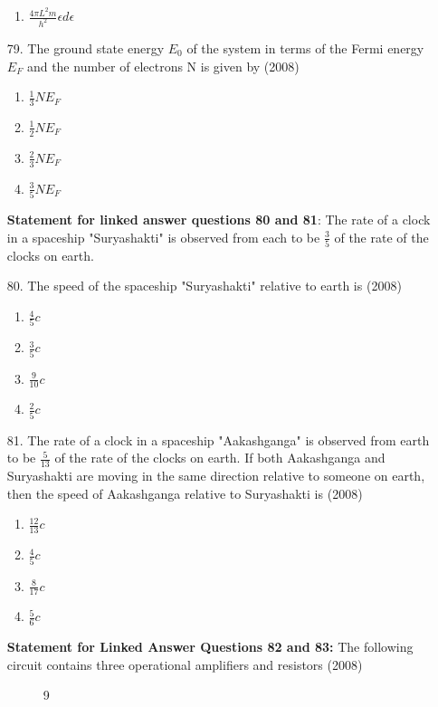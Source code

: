 \documentclass[journal]{IEEEtran}
\begin{document}
\begin{enumerate}
\begin{enumerate}[label=(\Alph*)]
        \item  $\frac{4\pi L^2 m}{h^2}\epsilon d\epsilon$
    \end{enumerate}
    \item[79.]  The ground state energy $E_0$ of the system in terms of the Fermi energy $E_F$ and the number of electrons N is given by \hfill (2008)
    \begin{enumerate}[label=(\Alph*)]
        \item $\frac{1}{3}NE_F$
        \item $\frac{1}{2}NE_F$
        \item $\frac{2}{3}NE_F$
        \item $\frac{3}{5}NE_F$
    \end{enumerate}
    \textbf{Statement for linked answer questions 80 and 81}:
    The rate of a clock in a spaceship "Suryashakti" is observed from each to be $\frac{3}{5}$ of the rate of the clocks on earth.
    \item[80.]  The speed of the spaceship "Suryashakti" relative to earth is \hfill (2008)
    \begin{enumerate}[label=(\Alph*)]
        \item $\frac{4}{5}c$
        \item $\frac{3}{5}c$
        \item $\frac{9}{10}c$
        \item $\frac{2}{5}c$
    \end{enumerate}
    \item[81.] The rate of a clock in a spaceship "Aakashganga" is observed from earth to be $\frac{5}{13}$ of the rate of the clocks on earth. If both Aakashganga and Suryashakti are moving in the same direction relative to someone on earth, then the speed of Aakashganga relative to Suryashakti is \hfill (2008)
    \begin{enumerate}[label=(\Alph*)]
        \item $\frac{12}{13}c$
        \item $\frac{4}{5}c$
        \item $\frac{8}{17}c$
        \item $\frac{5}{6}c$
    \end{enumerate}
    \textbf{Statement for Linked Answer Questions 82 and 83:}
    The following circuit contains three operational amplifiers and resistors \hfill (2008)
    \begin{figure}[!ht]
      \centering
        
      \caption{9} 
      \label{fig9} 
  \end{figure}
  

\end{enumerate}
\end{document}
